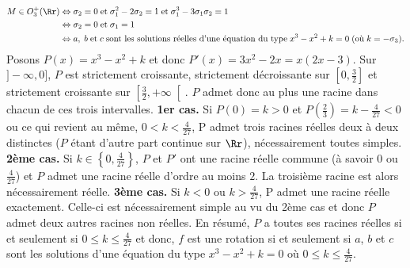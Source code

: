 {{\begin{align*}\ensuremath
M\in O_3^+(\Rr)&\Leftrightarrow\sigma_2=0\;\mbox{et}\;\sigma_1^2-2\sigma_2=1\;\mbox{et}\;\sigma_1^3-3\sigma_1\sigma_2=1\\
 &\Leftrightarrow\sigma_2=0\;\text{et}\;\sigma_1=1\\
 &\Leftrightarrow a,\;b\;\mbox{et}\;c\;\mbox{sont les solutions réelles d'une équation du type}\;x^3-x^2+k=0\;(\mbox{où}\;k=-\sigma_3).
\end{align*}
Posons $P(x)=x^3-x^2+k$ et donc $P'(x)=3x^2-2x=x(2x-3)$.
Sur $]-\infty,0]$, $P$ est strictement croissante, strictement décroissante sur $\left[0,\frac{3}{2}\right]$ et strictement croissante sur $\left[\frac{3}{2},+\infty\right[$. $P$ admet donc au plus une racine dans chacun de ces trois intervalles.
\textbf{1er cas.} Si $P(0)=k>0$ et $P\left(\frac{2}{3}\right)=k-\frac{4}{27}<0$ ou ce qui revient au même, $0<k<\frac{4}{27}$, P admet trois racines réelles deux à deux distinctes ($P$ étant d'autre part continue sur $\Rr$), nécessairement toutes simples.
\textbf{2ème cas.} Si $k\in\left\{0,\frac{4}{27}\right\}$, $P$ et $P'$ ont une racine réelle commune (à savoir $0$ ou $\frac{4}{27}$) et $P$ admet une racine réelle d'ordre au moins $2$. La troisième racine est alors nécessairement réelle.
\textbf{3ème cas.} Si $k<0$ ou $k>\frac{4}{27}$, P admet une racine réelle exactement. Celle-ci est nécessairement simple au vu du 2ème cas et donc $P$ admet deux autres racines non réelles.
En résumé, $P$ a toutes ses racines réelles si et seulement si $0\leq k\leq\frac{4}{27}$ et donc, $f$ est une rotation si et seulement si $a$, $b$ et $c$ sont les solutions d'une équation du type $x^3-x^2+k=0$ où $0\leq k\leq\frac{4}{27}$.}
}